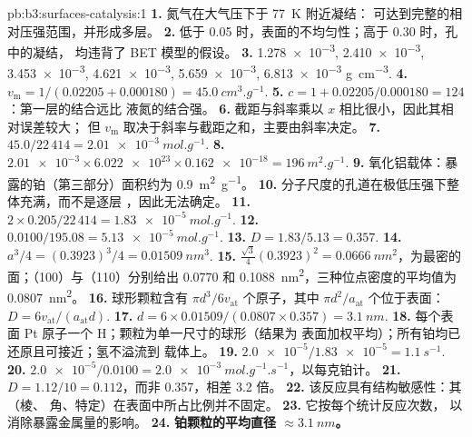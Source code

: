 \begin{solution}{pb:b3:surfaces-catalysis:1}
\textbf{1.} 氮气在大气压下于 \qty{77}{K} 附近凝结：
可达到完整的相对压强范围，并形成多层。
\textbf{2.} 低于 0.05 时，表面的不均匀性；高于 0.30 时，孔中的凝结，
均违背了 BET 模型的假设。
\textbf{3.} \num{1.278e-3}, \num{2.410e-3}, \num{3.453e-3}, \num{4.621e-3}, \num{5.659e-3}, \num{6.813e-3} \unit{g.cm^{-3}}.
\textbf{4.} $v_{\mathrm m} = 1/(0.02205 + 0.000180) = \qty{45.0}{cm^3.g^{-1}}$.
\textbf{5.} $c = 1 + 0.02205/0.000180 = 124$：第一层的结合远比
液氮的结合强。
\textbf{6.} 截距与斜率乘以 $x$ 相比很小，因此其相对误差较大；
但 $v_{\mathrm m}$ 取决于斜率与截距之和，主要由斜率决定。
\textbf{7.} $45.0/22\,414 = \qty{2.01e-3}{mol.g^{-1}}$.
\textbf{8.} $\num{2.01e-3} \times \num{6.022e23} \times \num{0.162e-18} = \qty{196}{m^2.g^{-1}}$.
\textbf{9.} 氧化铝载体：暴露的铂（第三部分）面积约为 \qty{0.9}{m^2.g^{-1}}。
\textbf{10.} 分子尺度的孔道在极低压强下整体充满，而不是逐层
，因此无法确定。
\textbf{11.} $2 \times 0.205/22\,414 = \qty{1.83e-5}{mol.g^{-1}}$.
\textbf{12.} $0.0100/195.08 = \qty{5.13e-5}{mol.g^{-1}}$.
\textbf{13.} $D = 1.83/5.13 = 0.357$.
\textbf{14.} $a^3/4 = (0.3923)^3/4 = \qty{0.01509}{nm^3}$.
\textbf{15.} $\frac{\sqrt3}{4}(0.3923)^2 = \qty{0.0666}{nm^2}$，为最密的面；（100）与（110）分别给出 0.0770 和
\qty{0.1088}{nm^2}，三种位点密度的平均值为 \qty{0.0807}{nm^2}。
\textbf{16.} 球形颗粒含有 $\pi d^3/6v_{\mathrm{at}}$ 个原子，其中 $\pi d^2/a_{\mathrm{at}}$ 个位于表面：
$D = 6v_{\mathrm{at}}/(a_{\mathrm{at}}d)$.
\textbf{17.} $d = 6 \times 0.01509/(0.0807 \times 0.357) = \qty{3.1}{nm}$.
\textbf{18.} 每个表面 Pt 原子一个 H；颗粒为单一尺寸的球形（结果为
表面加权平均）；所有铂均已还原且可接近；氢不溢流到
载体上。
\textbf{19.} $\num{2.0e-5}/\num{1.83e-5} = \qty{1.1}{s^{-1}}$.
\textbf{20.} $\num{2.0e-5}/0.0100 = \qty{2.0e-3}{mol.g^{-1}.s^{-1}}$，以每克铂计。
\textbf{21.} $D = 1.12/10 = 0.112$，而非 0.357，相差 3.2 倍。
\textbf{22.} 该反应具有结构敏感性：其（棱、
角、特定）在表面中所占比例并不固定。
\textbf{23.} 它按每个统计反应次数，
以消除暴露金属量的影响。
\textbf{24.} \textbf{铂颗粒的平均直径 $\approx \qty{3.1}{nm}$。}
\end{solution}
